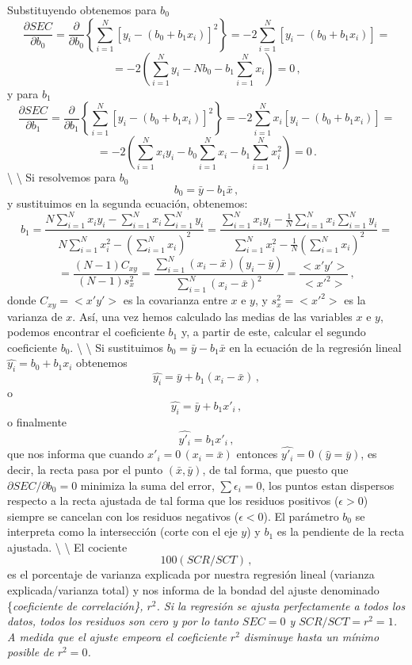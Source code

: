 \documentclass[
]{agujournal2019}
\begin{document}
\noindent Substituyendo obtenemos para \(b_0\)
\[\frac{\partial{SEC}}{\partial{b_0}} =\frac{\partial}{\partial{b_0}}
  \left\{
    \sum^N_{i=1} [y_i - (b_0+b_1 x_i)]^2
  \right\}=
  -2\sum^N_{i=1} [y_i - (b_0+b_1 x_i)]=\]
\[=-2\left(\sum^N_{i=1}y_i -N b_0 - b_1\sum^N_{i=1} x_i  \right)=0\,,\]
y para \(b_1\)
\[\frac{\partial{SEC}}{\partial{b_1}} =\frac{\partial{}}{\partial{b_1}}
  \left\{
    \sum^N_{i=1} [y_i - (b_0+b_1 x_i)]^2
  \right\}=
  -2\sum^N_{i=1} x_i [y_i - (b_0+b_1 x_i)]=\]
\[=-2\left(\sum^N_{i=1}x_i y_i - b_0\sum^N_{i=1}x_i - b_1\sum^N_{i=1} x^2_i \right)=0\,.\]
\textbackslash{} \textbackslash{} \noindent Si resolvemos para \(b_0\)
\[b_0=\bar{y}-b_1\bar{x}\,,\] y sustituimos en la segunda ecuación,
obtenemos:
\[b_1=\frac{N \sum\limits^N_{i=1} x_i y_i - \sum\limits^N_{i=1}x_i \sum\limits^N_{i=1}y_i}
           {N\sum\limits^N_{i=1}x^2_i-\left(\sum\limits^N_{i=1}x_i \right)^2}=
      \frac{\sum\limits^N_{i=1} x_i y_i - \frac{1}{N}\sum\limits^N_{i=1}x_i \sum\limits^N_{i=1}y_i}
           {\sum\limits^N_{i=1}x^2_i-\frac{1}{N}\left(\sum\limits^N_{i=1}x_i \right)^2}=\]
\[=\frac{(N-1)C_{xy}}{(N-1)s^2_x}=\frac{\sum\limits^N_{i=1} (x_i-\bar{x})(y_i-\bar{y})}
                                      {\sum\limits^N_{i=1} (x_i-\bar{x})^2}=\frac{<x'y'>}{<x'^2>}\,,\]
donde \(C_{xy}=<x'y'>\) es la covarianza entre \(x\) e \(y\), y
\(s^2_x=<x'^2>\) es la varianza de \(x\). Así, una vez hemos calculado
las medias de las variables \(x\) e \(y\), podemos encontrar el
coeficiente \(b_1\) y, a partir de este, calcular el segundo coeficiente
\(b_0\). \textbackslash{} \textbackslash{} \noindent Si sustituimos
\(b_0=\bar{y}-b_1\bar{x}\) en la ecuación de la regresión lineal
\(\hat{y_i}=b_0+b_1 x_i\) obtenemos
\[\hat{y_i}=\bar{y} +b_1(x_i-\bar{x})\,,\] o
\[\hat{y_i}=\bar{y} +b_1{x'_i}\,,\] o finalmente
\[\hat{y'_i}=b_1{x'_i}\,,\] que nos informa que cuando
\(x'_i=0\,(x_i=\bar{x})\) entonces \(\hat{y'_i}=0 \,(\hat{y}=\bar{y})\),
es decir, la recta pasa por el punto \((\bar{x},\bar{y})\), de tal
forma, que puesto que \(\partial{SEC}/{\partial{b_0}}=0\) minimiza la
suma del error, \(\sum \epsilon_i=0\), los puntos estan dispersos
respecto a la recta ajustada de tal forma que los residuos positivos
(\(\epsilon>0\)) siempre se cancelan con los residuos negativos
(\(\epsilon<0\)). El parámetro \(b_0\) se interpreta como la
intersección (corte con el eje \(y\)) y \(b_1\) es la pendiente de la
recta ajustada. \textbackslash{} \textbackslash{} \noindent El cociente
\[100(SCR/SCT)\,,\] es el porcentaje de varianza explicada por nuestra
regresión lineal (varianza explicada/varianza total) y nos informa de la
bondad del ajuste denominado \{\it coeficiente de correlación\},
\(r^2\). Si la regresión se ajusta perfectamente a todos los datos,
todos los residuos son cero y por lo tanto \(SEC=0\) y
\(SCR/SCT=r^2=1\). A medida que el ajuste empeora el coeficiente \(r^2\)
disminuye hasta un mínimo posible de \(r^2=0\).
\end{document}

